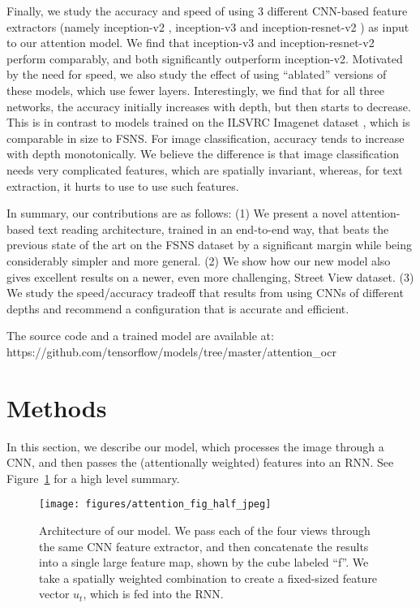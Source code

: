 \documentclass[conference]{IEEEtran}
\begin{document}
Finally, we study the accuracy and speed of
using 3 different CNN-based feature extractors
(namely   inception-v2 \cite{szegedy2015rethinking},
inception-v3 \cite{szegedy2016inception} and inception-resnet-v2
\cite{szegedy2016inception})
as input to our attention model.
We find that inception-v3 and inception-resnet-v2
perform comparably, and both significantly outperform
inception-v2.
Motivated by the need for speed,
we also study the effect of using ``ablated'' versions of these models,
which use fewer layers.
Interestingly, we find that for all three networks,
the accuracy initially increases with depth,
but then starts to decrease.
  This is in contrast to models trained on the ILSVRC Imagenet dataset
  \cite{ILSVRCarxiv14}, which is comparable in size to FSNS.
For image classification, accuracy tends to increase with depth monotonically.
We believe the difference is that image classification needs very complicated features, which are spatially invariant, whereas, for text extraction, it hurts to use to use such features.

In summary, our contributions are as follows:
(1) We present a novel attention-based text reading architecture, trained
in an end-to-end way, that beats the previous state of the art on the FSNS dataset
by a significant margin while being considerably simpler and more
general. (2) We show how our new model also gives excellent results on
a newer, even more challenging,  Street View dataset. 
(3) We study the speed/accuracy tradeoff that results from
using CNNs of different depths and recommend a
configuration that is accurate and efficient. 
 
The source code and a trained model are available at:\\
https://github.com/tensorflow/models/tree/master/attention\_ocr
 \section{Methods}

In this section, we describe our model, which processes the image
through a CNN, and then passes the (attentionally weighted) features
into an RNN. See Figure~\ref{fig:arch} for a high level summary.  

\begin{figure}
\begin{center}
\texttt{[image: figures/attention\_fig\_half\_jpeg]}
\caption{Architecture of our model.
  We pass each of the four views through the same CNN feature extractor, and then concatenate the results into a single large feature map, shown by the cube labeled ``f''. We take a spatially weighted combination to create a fixed-sized feature vector $u_t$, which is fed into the RNN.
}
\label{fig:arch}
\end{center}
\end{figure}
\end{document}
